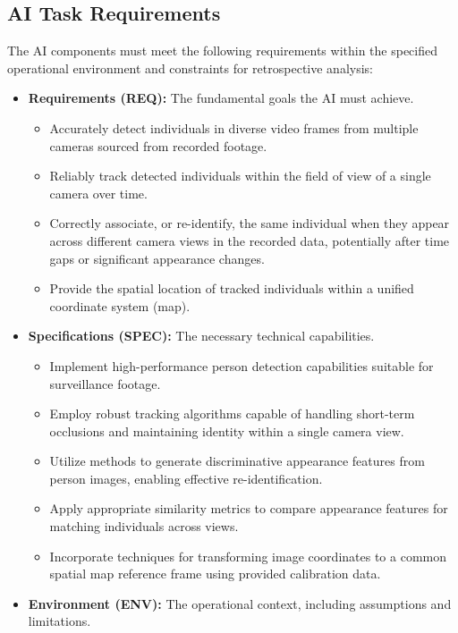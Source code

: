 \subsection{AI Task Requirements}
\label{subsection:ai_task_reqs_aic}
The AI components must meet the following requirements within the specified operational environment and constraints for retrospective analysis:
\begin{itemize}
    \item \textbf{Requirements (REQ):} The fundamental goals the AI must achieve.
        \begin{itemize}
            \item Accurately detect individuals in diverse video frames from multiple cameras sourced from recorded footage.
            \item Reliably track detected individuals within the field of view of a single camera over time.
            \item Correctly associate, or re-identify, the same individual when they appear across different camera views in the recorded data, potentially after time gaps or significant appearance changes.
            \item Provide the spatial location of tracked individuals within a unified coordinate system (map).
        \end{itemize}
    \item \textbf{Specifications (SPEC):} The necessary technical capabilities.
        \begin{itemize}
            \item Implement high-performance person detection capabilities suitable for surveillance footage.
            \item Employ robust tracking algorithms capable of handling short-term occlusions and maintaining identity within a single camera view.
            \item Utilize methods to generate discriminative appearance features from person images, enabling effective re-identification.
            \item Apply appropriate similarity metrics to compare appearance features for matching individuals across views.
            \item Incorporate techniques for transforming image coordinates to a common spatial map reference frame using provided calibration data.
        \end{itemize}
    \item \textbf{Environment (ENV):} The operational context, including assumptions and limitations.

\end{itemize}
